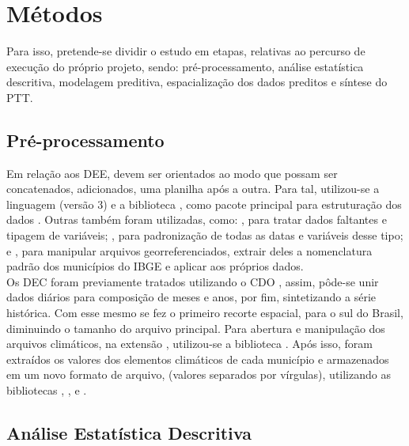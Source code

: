 \section{Métodos}

\indent Para isso, pretende-se dividir o estudo em etapas, relativas ao percurso de execução do próprio projeto, sendo: pré-processamento, análise estatística descritiva, modelagem preditiva, espacialização dos dados preditos e síntese do \acrfull{PTT}.\\


\subsection{Pré-processamento}

Em relação aos \acrshort{DEE}, devem ser orientados ao modo que possam ser concatenados, adicionados, uma planilha após a outra. Para tal, utilizou-se a linguagem  (versão 3) \cite{python3_2009_van}  e a biblioteca  \cite{pandas_2010_scipy, pandas_2020_reback}, como pacote principal para estruturação dos dados . Outras também foram utilizadas, como:  \cite{numpy_2020_harrisarray}, para tratar dados faltantes e tipagem de variáveis;  \cite{python2_1995_van}, para padronização de todas as datas e variáveis desse tipo; e  \cite{geopandas_2020_kelseyjordahl}, para manipular arquivos georreferenciados, extrair deles a nomenclatura padrão dos municípios do \acrshort{IBGE} e aplicar aos próprios dados.\\
\indent Os \acrshort{DEC} foram previamente tratados utilizando o \acrfull{CDO} \cite{CDO_2023_schulzweida}, assim, pôde-se unir dados diários para composição de meses e anos, por fim, sintetizando a série histórica. Com esse mesmo  se fez o primeiro recorte espacial, para o sul do Brasil, diminuindo o tamanho do arquivo principal. Para abertura e manipulação dos arquivos climáticos, na extensão , utilizou-se a biblioteca  \cite{xarray_2016_v0_8_0, xarray_2017_hoyer}. Após isso, foram extraídos os valores dos elementos climáticos de cada município e armazenados em um novo formato de arquivo,  (valores separados por vírgulas), utilizando as bibliotecas , ,  e  \cite{shapely_2007_gillies}.\\


\subsection{Análise Estatística Descritiva}

